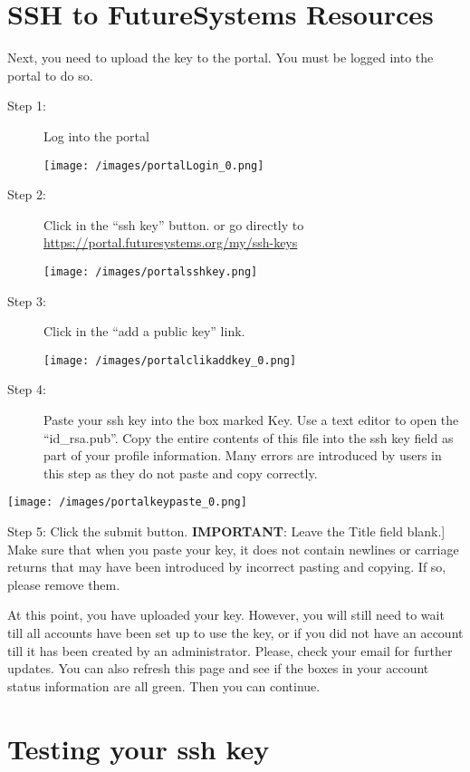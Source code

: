 \section{SSH to FutureSystems Resources}

Next, you need to upload the key to the portal. You must be logged into
the portal to do so.

\begin{description}
\item[Step 1:] Log into the portal

\texttt{[image: /images/portalLogin\_0.png]}

\item[Step 2:] Click in the ``ssh key'' button. or go directly to
\url{https://portal.futuresystems.org/my/ssh-keys}

\texttt{[image: /images/portalsshkey.png]}

\item[Step 3:] Click in the ``add a public key'' link.

\texttt{[image: /images/portalclikaddkey\_0.png]}

\item[Step 4:] Paste your ssh key into the box marked Key. Use a text
editor
to open the ``id\_rsa.pub''. Copy the entire contents of this file into
the ssh key field as part of your profile information. Many errors are
introduced by users in this step as they do not paste and copy
correctly.
\end{description}

\texttt{[image: /images/portalkeypaste\_0.png]}

Step 5: Click the submit button. \textbf{IMPORTANT}: Leave the
Title field blank.]
Make sure that when you paste your key, it does not contain newlines or
carriage returns that may have been introduced by incorrect pasting and
copying. If so, please remove them.


At this point, you have uploaded your key. However, you will still need
to wait till all accounts have been set up to use the key, or if you did
not have an account till it has been created by an administrator.
Please, check your email for further updates. You can also refresh this
page and see if the boxes in your account status information are all
green. Then you can continue.

\section{Testing your ssh key}\label{testing-your-ssh-key}

